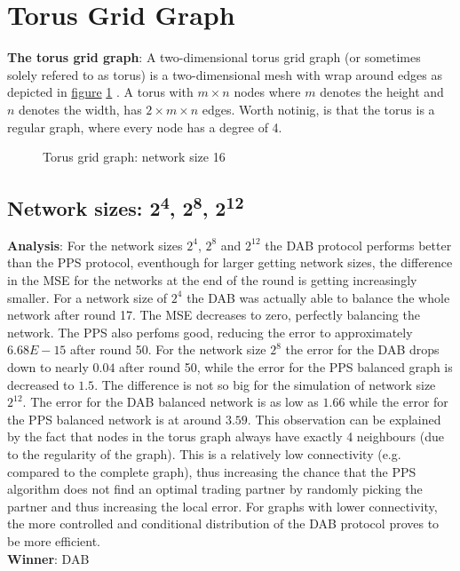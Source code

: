 \section{Torus Grid Graph}
\textbf{The torus grid graph}: A two-dimensional torus grid graph (or sometimes solely refered to as torus) is a two-dimensional mesh with wrap around edges as depicted in \hyperref[fig:torusGraph]{figure} \ref{fig:torusGraph} \cite{Mahlmann2010}. A torus with $m \times n$ nodes where $m$ denotes the height and $n$ denotes the width, has $2\times m \times n$ edges. Worth notinig, is that the torus is a regular graph, where every node has a degree of 4.

\begin{figure}[H]
    \centering
    \scalebox{1.5}{}
    \caption{Torus grid graph: network size 16}
    \label{fig:torusGraph}
\end{figure}

\subsection{Network sizes: 2\textsuperscript{4}, 2\textsuperscript{8}, 2\textsuperscript{12}}
\textbf{Analysis}: For the network sizes $2^{4}$, $2^{8}$ and $2^{12}$ the DAB protocol performs better than the PPS protocol, eventhough for larger getting network sizes, the difference in the MSE for the networks at the end of the round is getting increasingly smaller. For a network size of $2^{4}$ the DAB was actually able to balance the whole network after round 17. The MSE decreases to zero, perfectly balancing the network. The PPS also perfoms good, reducing the error to approximately $6.68E-15$ after round 50. For the network size $2^{8}$ the error for the DAB drops down to nearly $0.04$ after round 50, while the error for the PPS balanced graph is decreased to $1.5$. The difference is not so big for the simulation of network size $2^{12}$. The error for the DAB balanced network is as low as $1.66$ while the error for the PPS balanced network is at around $3.59$. This observation can be explained by the fact that nodes in the torus graph always have exactly 4 neighbours (due to the regularity of the graph). This is a relatively low connectivity (e.g. compared to the complete graph), thus increasing the chance that the PPS algorithm does not find an optimal trading partner by randomly picking the partner and thus increasing the local error. For graphs with lower connectivity, the more controlled and conditional distribution of the DAB protocol proves to be more efficient.\\
\textbf{Winner}: DAB \\

